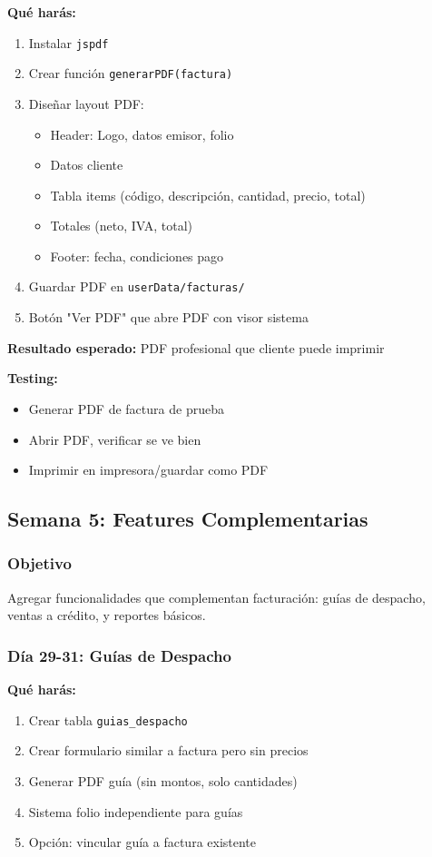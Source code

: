 \documentclass[11pt,a4paper]{article}
\begin{document}
\textbf{Qué harás:}
\begin{enumerate}
    \item Instalar \texttt{jspdf}
    \item Crear función \texttt{generarPDF(factura)}
    \item Diseñar layout PDF:
    \begin{itemize}
        \item Header: Logo, datos emisor, folio
        \item Datos cliente
        \item Tabla items (código, descripción, cantidad, precio, total)
        \item Totales (neto, IVA, total)
        \item Footer: fecha, condiciones pago
    \end{itemize}
    \item Guardar PDF en \texttt{userData/facturas/}
    \item Botón "Ver PDF" que abre PDF con visor sistema
\end{enumerate}

\textbf{Resultado esperado:} PDF profesional que cliente puede imprimir

\textbf{Testing:}
\begin{itemize}
    \item Generar PDF de factura de prueba
    \item Abrir PDF, verificar se ve bien
    \item Imprimir en impresora/guardar como PDF
\end{itemize}

\newpage

\subsection{Semana 5: Features Complementarias}

\subsubsection{Objetivo}
Agregar funcionalidades que complementan facturación: guías de despacho, ventas a crédito, y reportes básicos.

\subsubsection{Día 29-31: Guías de Despacho}

\textbf{Qué harás:}
\begin{enumerate}
    \item Crear tabla \texttt{guias\_despacho}
    \item Crear formulario similar a factura pero sin precios
    \item Generar PDF guía (sin montos, solo cantidades)
    \item Sistema folio independiente para guías
    \item Opción: vincular guía a factura existente
\end{enumerate}
\end{document}
